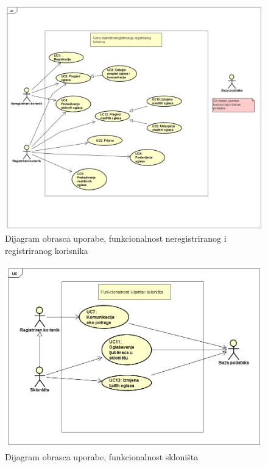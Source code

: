 					\begin{figure}[H]
						\includegraphics[scale=0.45]{dijagrami/dijagrami obrazaca uporabe/uc dijagram 1} %
						\centering
						\caption{Dijagram obrasca uporabe, funkcionalnost neregistriranog i registriranog korisnika}
						\label{fig:ucDijagram}
					\end{figure}
					
					\begin{figure}[H]
						\includegraphics[scale=0.63]{dijagrami/dijagrami obrazaca uporabe/uc dijagram 2} %
						\centering
						\caption{Dijagram obrasca uporabe, funkcionalnost skloništa}
						\label{fig:ucDijagram}
					\end{figure}
					
